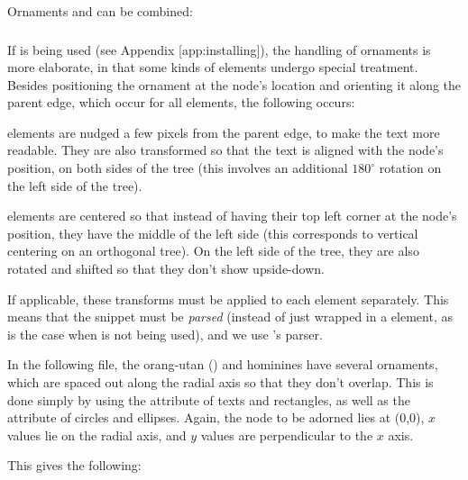 \noindent{}Ornaments and \css{} can be combined:

\startalignment[center]
\stopalignment

\subsubsection[sct:display:libxml]{\libxml}

If \libxml{} is being used (see Appendix \in{}[app:installing]), the handling of ornaments is more elaborate, in that some kinds of elements undergo special treatment. Besides positioning the ornament at the node's location and orienting it along the parent edge, which occur for all elements, the following occurs:
\startitemize
	\item {} elements are nudged a few pixels from the parent edge,
	to make the text more readable. They are also transformed so that the text
	is aligned with the node's position, on both sides of the tree (this
	involves an additional $180^{\circ}$  rotation on the left side of the
	tree).
	\item {} elements are centered so that instead of having
	their top left corner at the node's position, they have the middle of the
	left side (this corresponds to vertical centering on an orthogonal tree).
	On the left side of the tree, they are also rotated and shifted so that
	they don't show upside-down.
\stopitemize

If applicable, these transforms must be applied to each element separately.
This means that the \svg{} snippet must be {\em parsed} (instead of just
wrapped in a  element, as is the case when \libxml{} is not being
used), and we use \libxml's \xml{} parser. 

In the following file, the orang-utan () and hominines have
several ornaments, which are spaced out along the radial axis so that they don't
overlap. This is done simply by using the  attribute of texts and
rectangles, as well as the  attribute of circles and ellipses. Again,
the node to be adorned lies at (0,0), $x$ values lie on the radial axis, and $y$
values are perpendicular to the $x$ axis.


This gives the following:

\startalignment[center]
\stopalignment

